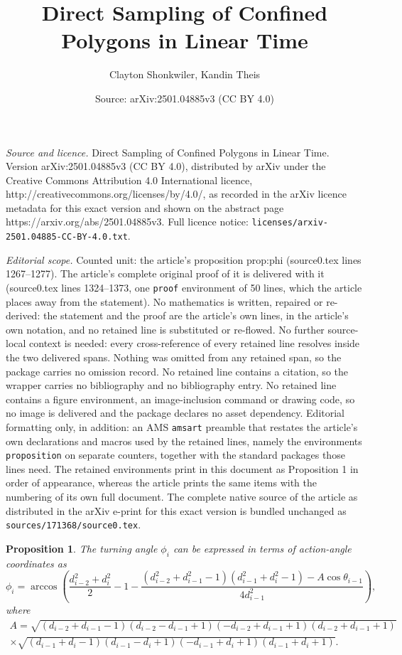 \documentclass[10pt,a4paper]{amsart}
\title{Direct Sampling of Confined Polygons in Linear Time}
\author{Clayton Shonkwiler, Kandin Theis}
\date{Source: arXiv:2501.04885v3 (CC BY 4.0)}
\newtheorem{proposition}{Proposition}
\begin{document}
\maketitle

\noindent\emph{Source and licence.} Direct Sampling of Confined Polygons in Linear Time. Version arXiv:2501.04885v3 (CC BY 4.0), distributed by arXiv under the Creative Commons Attribution 4.0 International licence, http://creativecommons.org/licenses/by/4.0/, as recorded in the arXiv licence metadata for this exact version and shown on the abstract page https://arxiv.org/abs/2501.04885v3. Full licence notice: \texttt{licenses/arxiv-2501.04885-CC-BY-4.0.txt}.\par\smallskip

\noindent\textit{Editorial scope.} Counted unit: the article's proposition prop:phi (source0.tex lines 1267--1277). The article's complete original proof of it is delivered with it (source0.tex lines 1324--1373, one \texttt{proof} environment of 50 lines, which the article places away from the statement). No mathematics is written, repaired or re-derived: the statement and the proof are the article's own lines, in the article's own notation, and no retained line is substituted or re-flowed.  No further source-local context is needed: every cross-reference of every retained line resolves inside the two delivered spans.  Nothing was omitted from any retained span, so the package carries no omission record.  No retained line contains a citation, so the wrapper carries no bibliography and no bibliography entry.  No retained line contains a figure environment, an image-inclusion command or drawing code, so no image is delivered and the package declares no asset dependency.  Editorial formatting only, in addition: an AMS \texttt{amsart} preamble that restates the article's own declarations and macros used by the retained lines, namely the environments \texttt{proposition} on separate counters, together with the standard packages those lines need.  The retained environments print in this document as Proposition 1 in order of appearance, whereas the article prints the same items with the numbering of its own full document.  The complete native source of the article as distributed in the arXiv e-print for this exact version is bundled unchanged as \texttt{sources/171368/source0.tex}.
	\begin{proposition}\label{prop:phi}
		The turning angle $\phi_i$ can be expressed in terms of action-angle coordinates as
		\begin{equation}\label{eq:phi}
			\phi_i = \arccos\left(\frac{d_{i-2}^2+d_i^2}{2} - 1 - \frac{(d_{i-2}^2 + d_{i-1}^2 - 1)(d_{i-1}^2 + d_{i}^2 - 1) - A \cos \theta_{i-1}}{4 d_{i-1}^2}\right),
		\end{equation}
		where 
		\begin{multline*}
			A = \sqrt{(d_{i-2}+d_{i-1}-1)(d_{i-2}-d_{i-1}+1)(-d_{i-2}+d_{i-1}+1)(d_{i-2}+d_{i-1}+1)}  \\
			\times \sqrt{(d_{i-1}+d_{i}-1)(d_{i-1}-d_{i}+1)(-d_{i-1}+d_{i}+1)(d_{i-1}+d_{i}+1)}.
		\end{multline*}
	\end{proposition}
\end{document}
